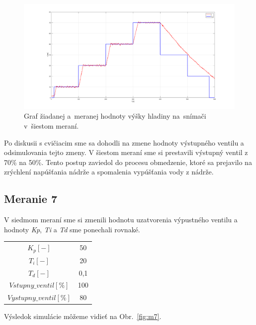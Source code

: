 \documentclass{article}
\begin{document}
\begin{figure}[!htbp]
	\begin{center}
		\includegraphics[width=\textwidth]{./include/meranie6.png}
	\end{center}
	\caption{Graf žiadanej a~meranej hodnoty výšky hladiny na~snímači v~šiestom meraní.}
	\label{fig:m6}
\end{figure}

Po diskusii s cvičiacim sme sa dohodli na zmene hodnoty výstupného ventilu a odsimulovania tejto zmeny.
V šiestom meraní sme si prestavili výstupný ventil z 70\% na 50\%. Tento postup zaviedol do procesu
obmedzenie, ktoré sa prejavilo na zrýchlení napúšťania nádrže a spomalenia vypúšťania vody z nádrže.

\clearpage

\subsection{Meranie 7}
\label{sec:meranie7}

V siedmom meraní sme si zmenili hodnotu uzatvorenia výpustného ventilu a hodnoty \textit{Kp}, \textit{Ti}
a \textit{Td} sme ponechali rovnaké.

\begin{center}
\begin{tabular}{ |c|c| }
 \hline
 $K_p [-]$ & 50 \\
 $T_i [-]$ & 20 \\
 $T_d [-]$ & 0,1 \\
 \hline
 $Vstupny\_ventil[\%]$ & 100 \\
 $Vystupny\_ventil[\%]$ & 80 \\
 \hline
\end{tabular}
\end{center}

Výsledok simulácie môžeme vidieť na Obr.~\ref{fig:m7}.
\end{document}

